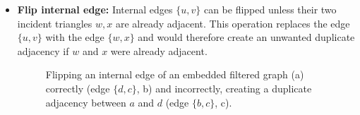 \begin{itemize}
	\clearpage
	\item \textbf{Flip internal edge:} Internal edges $\{u, v\}$ can be flipped unless their two incident triangles  $w, x$ are already adjacent. This operation replaces the edge $\{u, v\}$ with the edge $\{w, x\}$ and would therefore create an unwanted duplicate adjacency if $w$ and $x$ were already adjacent.
\begin{figure}[H]
	\centering
	\quad
	\quad
	\caption{Flipping an internal edge of an embedded filtered graph (a) correctly (edge $\{d,c\}$, b) and incorrectly, creating a duplicate adjacency between $a$ and $d$ (edge $\{b,c\}$, c).}
	\label{fig:transformation}
\end{figure}


\end{itemize}
